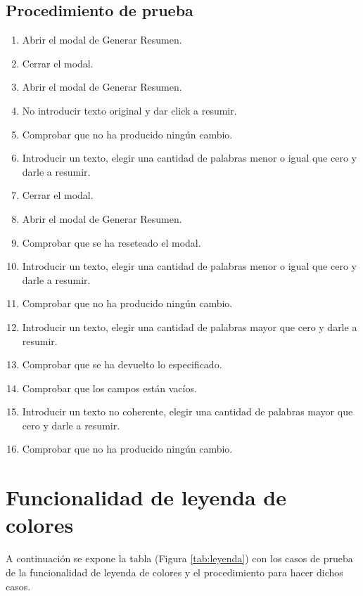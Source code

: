 \subsection{Procedimiento de prueba}
\label{procedimientoPruebas:resumen}
\begin{enumerate}
    \item Abrir el modal de Generar Resumen.
    \item Cerrar el modal.
    \item Abrir el modal de Generar Resumen.
    \item No introducir texto original y dar click a resumir.
    \item Comprobar que no ha producido ningún cambio.
    \item Introducir un texto, elegir una cantidad de palabras menor o igual que cero y darle a resumir.
    \item Cerrar el modal.
    \item Abrir el modal de Generar Resumen.
    \item Comprobar que se ha reseteado el modal.
    \item Introducir un texto, elegir una cantidad de palabras menor o igual que cero y darle a resumir.
    \item Comprobar que no ha producido ningún cambio.
    \item Introducir un texto, elegir una cantidad de palabras mayor que cero y darle a resumir.
    \item Comprobar que se ha devuelto lo especificado. 
    \item Comprobar que los campos están vacíos.
    \item Introducir un texto no coherente, elegir una cantidad de palabras mayor que cero y darle a resumir.
    \item Comprobar que no ha producido ningún cambio.
    
\end{enumerate}


\section{Funcionalidad de leyenda de colores}
\label{planPruebas:leyenda}
A continuación se expone la tabla (Figura \ref{tab:leyenda}) con los casos de prueba de la funcionalidad de leyenda de colores y el procedimiento para hacer dichos casos.

